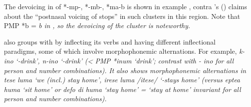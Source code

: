 The devoicing in  of *-mp-,
*-mb-, *ma-b is shown in example ,
contra \citeauthor{Blust2009}'s (\citeyear[72]{Blust2009})
claims about the “postnasal voicing
of stops” in such clusters in this region.
Note that PMP *b = \it{b} in ,
so the devoicing of the cluster is noteworthy.


 also groups with  by inflecting its verbs
and having different inflectional paradigms,
some of which involve morphophonemic alternations.
For example, \it{k-ino} ‘-drink’,
\it{n-ino} ‘-drink’ (< PMP *inum ‘drink’; contrast with
- \it{ino} for all person and number combinations).
It also shows morphophonemic alternations in \it{tese luma} ‘we (incl.)
stay home’, \it{irese luma} /i{\nbhyp}tese/ ‘-stays home’ (versus 
\it{eptea huma} ‘sit home’ or \it{defo di huma} ‘stay 
home’ = ‘stay at home’ invariant for all person and number combinations).

